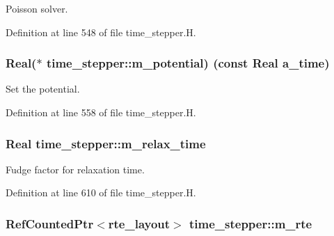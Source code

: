 Poisson solver. 



Definition at line 548 of file time\+\_\+stepper.\+H.

\subsubsection[{\texorpdfstring{m\+\_\+potential}{m_potential}}]{\setlength{\rightskip}{0pt plus 5cm}Real($\ast$ time\+\_\+stepper\+::m\+\_\+potential) (const Real a\+\_\+time)\hspace{0.3cm}{\ttfamily [protected]}}\hypertarget{classtime__stepper_a53923894761481d4f6fc1d226cd359b5}{}\label{classtime__stepper_a53923894761481d4f6fc1d226cd359b5}


Set the potential. 



Definition at line 558 of file time\+\_\+stepper.\+H.

\subsubsection[{\texorpdfstring{m\+\_\+relax\+\_\+time}{m_relax_time}}]{\setlength{\rightskip}{0pt plus 5cm}Real time\+\_\+stepper\+::m\+\_\+relax\+\_\+time\hspace{0.3cm}{\ttfamily [protected]}}\hypertarget{classtime__stepper_a895f7fd304fc34a7ec783b25492143df}{}\label{classtime__stepper_a895f7fd304fc34a7ec783b25492143df}


Fudge factor for relaxation time. 



Definition at line 610 of file time\+\_\+stepper.\+H.

\subsubsection[{\texorpdfstring{m\+\_\+rte}{m_rte}}]{\setlength{\rightskip}{0pt plus 5cm}Ref\+Counted\+Ptr$<${\bf rte\+\_\+layout}$>$ time\+\_\+stepper\+::m\+\_\+rte\hspace{0.3cm}{\ttfamily [protected]}}\hypertarget{classtime__stepper_ace365dde5918ec979d191d19519afc1f}{}\label{classtime__stepper_ace365dde5918ec979d191d19519afc1f}


